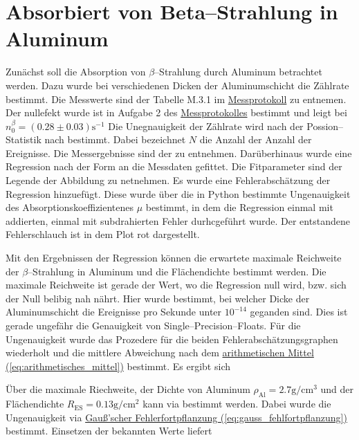 \newpage

\section{Absorbiert von Beta--Strahlung in Aluminum}
\label{sec:A1}
Zunächst soll die Absorption von $\beta$--Strahlung durch Aluminum betrachtet werden. Dazu wurde bei verschiedenen Dicken der Aluminumschicht die Zählrate bestimmt. Die Messwerte sind der Tabelle M.3.1 im \hyperref[ch:Protokoll]{Messprotokoll} zu entnemen. Der nullefekt wurde ist in Aufgabe 2 des \hyperref[ch:Protokoll]{Messprotokolles} bestimmt und leigt bei $n_0^\beta = (0.28 \pm 0.03) \mathrm{s^{-1}}$
Die Unegnauigkeit der Zählrate wird nach der Possion--Statistik nach
bestimmt. Dabei bezeichnet $N$ die Anzahl der Anzahl der Ereignisse.
Die Messergebnisse sind der  zu entnehmen.
Darüberhinaus wurde eine Regression nach  der Form
an die Messdaten gefittet. Die Fitparameter sind der Legende der Abbildung zu netnehmen. 
Es wurde eine Fehlerabschätzung der Regression hinzuefügt. Diese wurde über die in Python bestimmte Ungenauigkeit des Absorptionskoeffizientenes $\mu$ bestimmt, in dem die Regression einmal mit addierten, einmal mit subdrahierten Fehler durhcgeführt wurde. Der entstandene Fehlerschlauch ist in dem Plot rot dargestellt. 


Mit den Ergebnissen der Regression können die erwartete maximale Reichweite der $\beta$--Strahlung in Aluminum und die Flächendichte bestimmt werden. 
Die maximale Reichweite ist gerade der Wert, wo die Regression null wird, bzw. sich der Null belibig nah nährt. Hier wurde bestimmt, bei welcher Dicke der Aluminumschicht die Ereignisse pro Sekunde unter $10^{-14}$ geganden sind. Dies ist gerade ungefähr die Genauigkeit von Single--Precision--Floats. Für die Ungenauigkeit wurde das Prozedere für die beiden Fehlerabschätzungsgraphen wiederholt und die mittlere Abweichung nach dem \hyperref[eq:arithmetisches_mittel]{arithmetischen Mittel (\ref*{eq:arithmetisches_mittel})} bestimmt. Es ergibt sich 

Über die maximale Riechweite, der Dichte von Aluminum $\rho_\text{Al} = 2.7 \mathrm{g/cm^3}$ und der Flächendichte $R_\text{ES} = 0.13 \mathrm{g/cm^2}$ kann via
bestimmt werden. Dabei wurde die Ungenauigkeit via \hyperref[eq:gauss_fehlfortpflanzung]{Gauß'scher Fehlerfortpflanzung (\ref*{eq:gauss_fehlfortpflanzung})} bestimmt.  Einsetzen der bekannten Werte liefert

